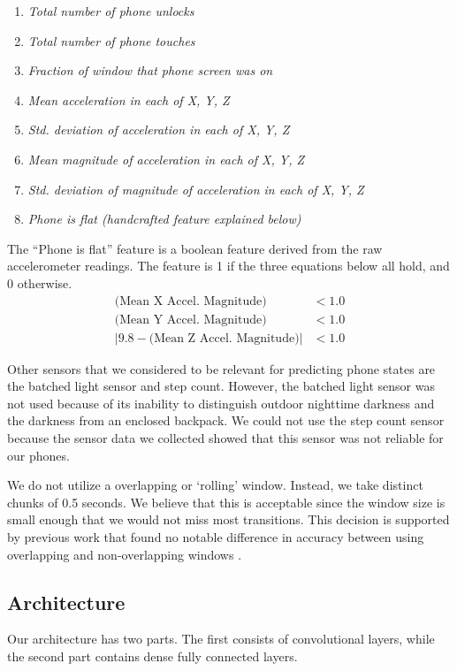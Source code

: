\begin{enumerate}
\item \textit{Total number of phone unlocks}
\item \textit{Total number of phone touches}
\item \textit{Fraction of window that phone screen was on}
\item \textit{Mean acceleration in each of X, Y, Z}
\item \textit{Std. deviation of acceleration in each of X, Y, Z}
\item \textit{Mean magnitude of acceleration in each of X, Y, Z}
\item \textit{Std. deviation of magnitude of acceleration in each of X, Y, Z}
\item \textit{Phone is flat (handcrafted feature explained below)}
\end{enumerate}

The ``Phone is flat'' feature is a boolean feature derived from the raw accelerometer readings. 
The feature is 1 if the three equations below all hold, and 0 otherwise.
\begin{align*}
 \text{(Mean X Accel. Magnitude)} &< 1.0\\
\text{(Mean Y Accel. Magnitude)} &< 1.0\\
|9.8 - \text{(Mean Z Accel. Magnitude)}| &< 1.0
\end{align*}

Other sensors that we considered to be relevant for predicting phone states are the batched light sensor and step count.
However, the batched light sensor was not used because of its inability to distinguish outdoor nighttime darkness and the darkness from an enclosed backpack. 
We could not use the step count sensor because the sensor data we collected showed that this sensor was not reliable for our phones. 

We do not utilize a overlapping or `rolling' window.  Instead, we take distinct chunks of 0.5 seconds.
We believe that this is acceptable since the window size is small enough that we would not miss most transitions.
This decision is supported by previous work that found no notable difference in accuracy between using overlapping and non-overlapping windows \cite{Martin2013}.

\subsection{Architecture}
Our architecture has two parts.
The first consists of convolutional layers, while the second part contains dense fully connected layers.


